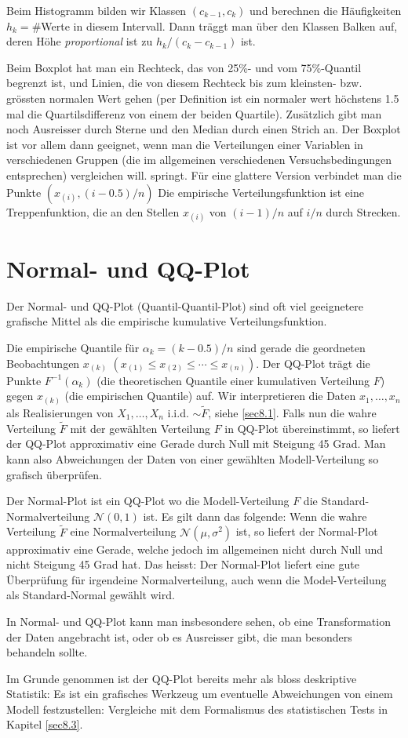 Beim Histogramm bilden wir Klassen $(c_{k-1},c_k)$ und berechnen die Häufigkeiten $h_k=$\#Werte in diesem Intervall. Dann träggt man über den Klassen Balken auf, deren Höhe \emph{proportional} ist zu $h_k/(c_k-c_{k-1})$ ist.

Beim Boxplot hat man ein Rechteck, das von 25\%- und vom 75\%-Quantil begrenzt ist, und Linien, die von diesem Rechteck bis zum kleinsten- bzw. grössten \glqq normalen \grqq Wert gehen (per Definition ist ein normaler wert höchstens 1.5 mal die Quartilsdifferenz von einem der beiden Quartile). Zusätzlich gibt man noch Ausreisser durch Sterne und den Median durch einen Strich an. Der Boxplot ist vor allem dann geeignet, wenn man die Verteilungen einer Variablen in verschiedenen Gruppen (die im allgemeinen verschiedenen Versuchsbedingungen entsprechen) vergleichen will.
springt. Für eine glattere Version verbindet man die Punkte $(x_{(i)},(i-0.5)/n)$
Die empirische Verteilungsfunktion ist eine Treppenfunktion, die an den Stellen $x_{(i)}$ von $(i-1)/n$ auf $i/n$ durch Strecken.
\section{Normal- und QQ-Plot}
\label{sec7.3}
Der Normal- und QQ-Plot (\glqq Quantil-Quantil-Plot\grqq) sind oft viel geeignetere grafische Mittel als die empirische kumulative Verteilungsfunktion.

Die empirische Quantile für $\alpha_k=(k-0.5)/n$ sind gerade die geordneten Beobachtungen $x_{(k)}$ $(x_{(1)}\leq x_{(2)}\leq \cdots \leq x_{(n)})$. Der QQ-Plot trägt die Punkte $F^{-1}(\alpha_k)$ (die theoretischen Quantile einer kumulativen Verteilung $F$) gegen $x_{(k)}$ (die empirischen Quantile) auf. Wir interpretieren die Daten $x_1,\ldots,x_n$ als Realisierungen von $X_1,\ldots,X_n$ i.i.d. $\sim \tilde{F}$, siehe \ref{sec8.1}. Falls nun die wahre Verteilung $\tilde{F}$ mit der gewählten Verteilung $F$ in QQ-Plot übereinstimmt, so liefert der QQ-Plot approximativ eine Gerade durch Null mit Steigung 45 Grad. Man kann also Abweichungen der Daten von einer gewählten Modell-Verteilung so grafisch überprüfen.

Der Normal-Plot ist ein QQ-Plot wo die Modell-Verteilung $F$ die Standard-Normalverteilung $\mathcal{N}(0,1)$ ist. Es gilt dann das folgende: Wenn die wahre Verteilung $\tilde{F}$ eine Normalverteilung $\mathcal{N}(\mu,\sigma^2)$ ist, so liefert der Normal-Plot approximativ eine Gerade, welche jedoch im allgemeinen nicht durch Null und nicht Steigung 45 Grad hat. Das heisst: Der Normal-Plot liefert eine gute Überprüfung für irgendeine Normalverteilung, auch wenn die Model-Verteilung als Standard-Normal gewählt wird.

In Normal- und QQ-Plot kann man insbesondere sehen, ob eine Transformation der Daten angebracht ist, oder ob es Ausreisser gibt, die man besonders behandeln sollte.

Im Grunde genommen ist der QQ-Plot bereits mehr als bloss deskriptive Statistik: Es ist ein grafisches Werkzeug um eventuelle Abweichungen von einem Modell festzustellen: Vergleiche mit dem Formalismus des statistischen Tests in Kapitel \ref{sec8.3}.
